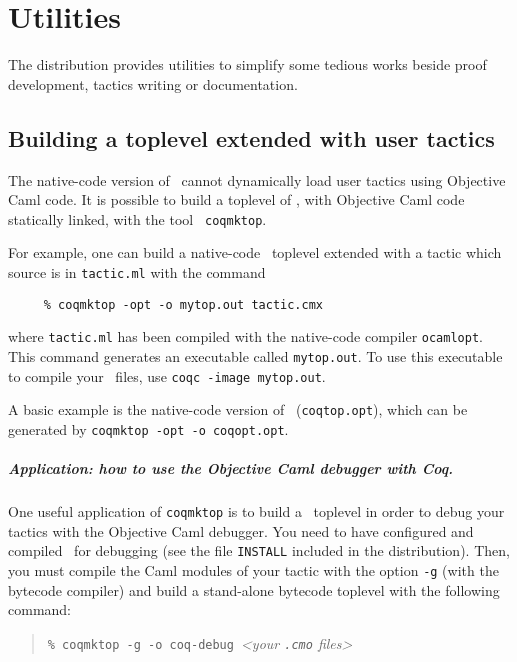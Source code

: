 \chapter{Utilities}\label{Utilities}

The distribution provides utilities to simplify some tedious works
beside proof development, tactics writing or documentation.

\section{Building a toplevel extended with user tactics}
\label{Coqmktop}

The native-code version of \Coq\ cannot dynamically load user tactics
using Objective Caml code. It is possible to build a toplevel of \Coq,
with Objective Caml code statically linked, with the tool {\tt
  coqmktop}.

For example, one can build a native-code \Coq\ toplevel extended with a tactic
which source is in {\tt tactic.ml} with the command 
\begin{verbatim}
     % coqmktop -opt -o mytop.out tactic.cmx
\end{verbatim}
where {\tt tactic.ml} has been compiled with the native-code
compiler {\tt ocamlopt}. This command generates an executable
called {\tt mytop.out}. To use this executable to compile your \Coq\
files, use {\tt coqc -image mytop.out}.

A basic example is the native-code version of \Coq\ ({\tt coqtop.opt}),
which can be generated by {\tt coqmktop -opt -o coqopt.opt}.


\paragraph{Application: how to use the Objective Caml debugger with Coq.}
\index{Debugger}

One useful application of \texttt{coqmktop} is to build a \Coq\ toplevel in
order to debug your tactics with the Objective Caml debugger.
You need to have configured and compiled \Coq\ for debugging
(see the file \texttt{INSTALL} included in the distribution).
Then, you must compile the Caml modules of your tactic with the
option \texttt{-g} (with the bytecode compiler) and build a stand-alone
bytecode toplevel with the following command:

\begin{quotation}
\texttt{\% coqmktop -g -o coq-debug}~\emph{<your \texttt{.cmo} files>}
\end{quotation}


